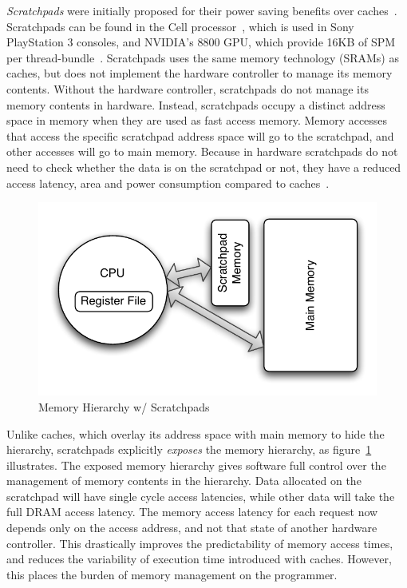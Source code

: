 \emph{Scratchpads} were initially proposed for their power saving benefits over caches~\cite{Banakar2002}.
Scratchpads can be found in the Cell processor~\cite{cellproc}, which is used in Sony PlayStation 3 consoles, and NVIDIA's 8800 GPU, which provide 16KB of SPM per thread-bundle~\cite{8800gpu}.
Scratchpads uses the same memory technology (SRAMs) as caches, but does not implement the hardware controller to manage its memory contents.
Without the hardware controller, scratchpads do not manage its memory contents in hardware.
Instead, scratchpads occupy a distinct address space in memory when they are used as fast access memory.
Memory accesses that access the specific scratchpad address space will go to the scratchpad, and other accesses will go to main memory. 
Because in hardware scratchpads do not need to check whether the data is on the scratchpad or not, they have a reduced access latency, area and power consumption compared to caches~\cite{Banakar2002}. 

\begin{figure}
  \vspace{-20pt}
  \begin{center}
    \includegraphics[scale=.5]{figs/pret_mem_hierarchy}
  \end{center}
  \vspace{-10pt}
  \caption{Memory Hierarchy w/ Scratchpads}
  \label{fig:pret_mem_hierarchy}
\end{figure}   

Unlike caches, which overlay its address space with main memory to hide the hierarchy, scratchpads explicitly \emph{exposes} the memory hierarchy, as figure~\ref{fig:pret_mem_hierarchy} illustrates.  
The exposed memory hierarchy gives software full control over the management of memory contents in the hierarchy.
Data allocated on the scratchpad will have single cycle access latencies, while other data will take the full DRAM access latency. 
The memory access latency for each request now depends only on the access address, and not that state of another hardware controller. 
This drastically improves the predictability of memory access times, and reduces the variability of execution time introduced with caches.
However, this places the burden of memory management on the programmer. 

